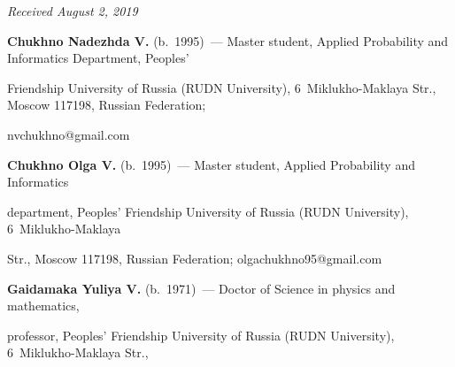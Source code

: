 







\vspace*{-6pt}





\hfill{\small\textit{Received August 2, 2019}} 





\vspace*{-18pt}





\Contr





\vspace*{-2pt}





\noindent


\textbf{Chukhno Nadezhda V.} (b.\ 1995)~--- Master student, Applied Probability and Informatics Department, Peoples' 


Friendship University of Russia (RUDN University), 6~Miklukho-Maklaya Str., Moscow 117198, Russian Federation; 


\mbox{nvchukhno@gmail.com}





\vspace*{3pt}





\noindent


\textbf{Chukhno Olga V.} (b.\ 1995)~--- Master student, Applied Probability and Informatics 


department, Peoples' Friendship University of Russia (RUDN University), 6~Miklukho-Maklaya 


Str., Moscow 117198, Russian Federation; \mbox{olgachukhno95@gmail.com}





\vspace*{3pt}





\noindent


\textbf{Gaidamaka Yuliya V.} (b.\ 1971)~--- Doctor of Science in physics and mathematics, 


professor, Peoples' Friendship University of Russia (RUDN University), 6~Miklukho-Maklaya Str., 


